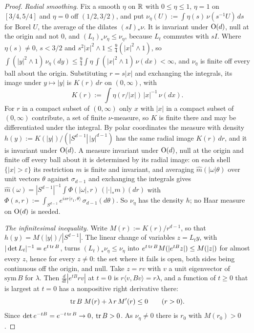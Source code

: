 \begin{proof}
\emph{Radial smoothing.} Fix a smooth $\eta$ on $\mathbb{R}$ with $0 \le \eta \le 1$, $\eta = 1$ on
$[3/4, 5/4]$ and $\eta = 0$ off $(1/2, 3/2)$, and put $\nu_\eta(U) := \int\eta(s)\,\nu(s^{-1}U)\,ds$ for
Borel $U$, the average of the dilates $(sI)_*\nu$. It is invariant under $\mathrm{O}(d)$, null at the
origin and not $0$, and $(L_t)_*\nu_\eta \le \nu_\eta$, because $L_t$ commutes with $sI$. Where
$\eta(s) \ne 0$, $s < 3/2$ and $s^2|x|^2 \wedge 1 \le \frac94(|x|^2 \wedge 1)$, so
$\int(|y|^2 \wedge 1)\,\nu_\eta(dy) \le \frac94\int\eta\,\int(|x|^2 \wedge 1)\,\nu(dx) < \infty$, and
$\nu_\eta$ is finite off every ball about the origin. Substituting $r = s|x|$ and exchanging the
integrals, its image under $y \mapsto |y|$ is $K(r)\,dr$ on $(0,\infty)$, with
\[
  K(r) := \int\eta(r/|x|)\,|x|^{-1}\,\nu(dx) .
\]
For $r$ in a compact subset of $(0,\infty)$ only $x$ with $|x|$ in a compact subset of $(0,\infty)$
contribute, a set of finite $\nu$-measure, so $K$ is finite there and may be differentiated under the
integral. By polar coordinates the measure with density $h(y) := K(|y|)/(|S^{d-1}|\,|y|^{d-1})$ has the
same radial image $K(r)\,dr$, and it is invariant under $\mathrm{O}(d)$. A measure invariant under
$\mathrm{O}(d)$, null at the origin and finite off every ball about it is determined by its radial image:
on each shell $\{|x| > \varepsilon\}$ its restriction $m$ is finite and invariant, and averaging
$\widehat m(|\omega|\theta)$ over unit vectors $\theta$ against $\sigma_{d-1}$ and exchanging the integrals
gives $\widehat m(\omega) = |S^{d-1}|^{-1}\int\Phi(|\omega|,r)\,(|\cdot|_*m)(dr)$ with
$\Phi(s,r) := \int_{S^{d-1}}e^{isr\langle e_1,\theta\rangle}\,\sigma_{d-1}(d\theta)$. So $\nu_\eta$ has the
density $h$; no Haar measure on $\mathrm{O}(d)$ is needed.

\emph{The infinitesimal inequality.} Write $M(r) := K(r)/r^{d-1}$, so that $h(y) = M(|y|)/|S^{d-1}|$.
The linear change of variables $z = L_ty$, with $|\det L_t|^{-1} = e^{t\operatorname{tr} B}$, turns
$(L_t)_*\nu_\eta \le \nu_\eta$ into $e^{t\operatorname{tr} B}M(|e^{tB}z|) \le M(|z|)$ for almost every $z$, hence for
every $z \ne 0$: the set where it fails is open, both sides being continuous off the origin, and
null. Take $z = rv$ with $v$ a unit eigenvector of $\mathrm{sym}\,B$ for $\lambda$. Then
$\tfrac{d}{dt}|e^{tB}rv|$ at $t = 0$ is $r\langle v,Bv\rangle = r\lambda$, and a function of $t \ge 0$
that is largest at $t = 0$ has a nonpositive right derivative there:
\[
  \operatorname{tr} B\;M(r) + \lambda\,r\,M'(r) \le 0 \qquad (r > 0).
\]
Since $\det e^{-tB} = e^{-t\operatorname{tr} B} \to 0$, $\operatorname{tr} B > 0$. As $\nu_\eta \ne 0$ there is $r_0$ with
$M(r_0) > 0$.


\end{proof}
